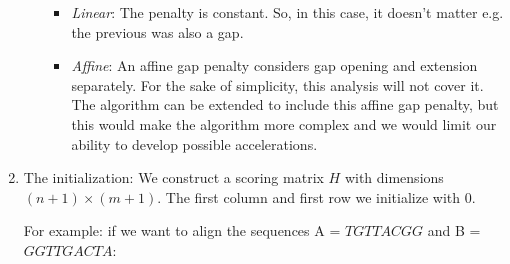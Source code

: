\begin{enumerate}
\begin{itemize}
		\begin{itemize}
			\item \emph{Linear}: The penalty is constant. So, in this case, it doesn't matter e.g. the previous was also a gap.
			\item \emph{Affine}: An affine gap penalty considers gap opening and extension separately. For the sake of simplicity, this analysis will not cover it. The algorithm can be extended to include this affine gap penalty, but this would make the algorithm more complex and we would limit our ability to develop possible accelerations.
		\end{itemize}
		
		
	\end{itemize}
	
	
	\item The initialization: We construct a scoring matrix $H$ with dimensions $(n+1)\times(m+1)$. The first column and first row we initialize with $0$.
	
	For example: if we want to align the sequences A = $TGTTACGG$ and B = $GGTTGACTA$:
	

\end{enumerate}
